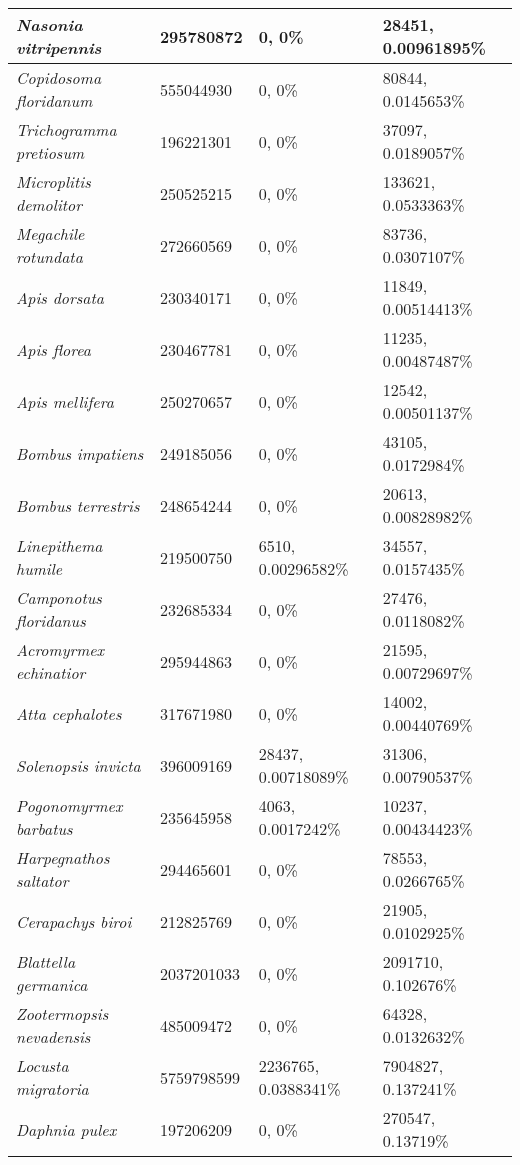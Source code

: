 {\begin{longtable}{| L{4cm} | L{2.7cm}  | L{3.7cm} | L{3.7cm} |}
\textit{Nasonia vitripennis} & 295780872 & 0, 0\% & 28451, 0.00961895\% \\ \hline
\textit{Copidosoma floridanum} & 555044930 & 0, 0\% & 80844, 0.0145653\% \\ \hline
\textit{Trichogramma pretiosum} & 196221301 & 0, 0\% & 37097, 0.0189057\% \\ \hline
\textit{Microplitis demolitor} & 250525215 & 0, 0\% & 133621, 0.0533363\% \\ \hline
\textit{Megachile rotundata} & 272660569 & 0, 0\% & 83736, 0.0307107\% \\ \hline
\textit{Apis dorsata} & 230340171 & 0, 0\% & 11849, 0.00514413\% \\ \hline
\textit{Apis florea} & 230467781 & 0, 0\% & 11235, 0.00487487\% \\ \hline
\textit{Apis mellifera} & 250270657 & 0, 0\% & 12542, 0.00501137\% \\ \hline
\textit{Bombus impatiens} & 249185056 & 0, 0\% & 43105, 0.0172984\% \\ \hline
\textit{Bombus terrestris} & 248654244 & 0, 0\% & 20613, 0.00828982\% \\ \hline
\textit{Linepithema humile} & 219500750 & 6510, 0.00296582\% & 34557, 0.0157435\% \\ \hline
\textit{Camponotus floridanus} & 232685334 & 0, 0\% & 27476, 0.0118082\% \\ \hline
\textit{Acromyrmex echinatior} & 295944863 & 0, 0\% & 21595, 0.00729697\% \\ \hline
\textit{Atta cephalotes} & 317671980 & 0, 0\% & 14002, 0.00440769\% \\ \hline
\textit{Solenopsis invicta} & 396009169 & 28437, 0.00718089\% & 31306, 0.00790537\% \\ \hline
\textit{Pogonomyrmex barbatus} & 235645958 & 4063, 0.0017242\% & 10237, 0.00434423\% \\ \hline
\textit{Harpegnathos saltator} & 294465601 & 0, 0\% & 78553, 0.0266765\% \\ \hline
\textit{Cerapachys biroi} & 212825769 & 0, 0\% & 21905, 0.0102925\% \\ \hline
\textit{Blattella germanica} & 2037201033 & 0, 0\% & 2091710, 0.102676\% \\ \hline
\textit{Zootermopsis nevadensis} & 485009472 & 0, 0\% & 64328, 0.0132632\% \\ \hline
\textit{Locusta migratoria} & 5759798599 & 2236765, 0.0388341\% & 7904827, 0.137241\% \\ \hline
\textit{Daphnia pulex} & 197206209 & 0, 0\% & 270547, 0.13719\% \\ \hline

\end{longtable}}
